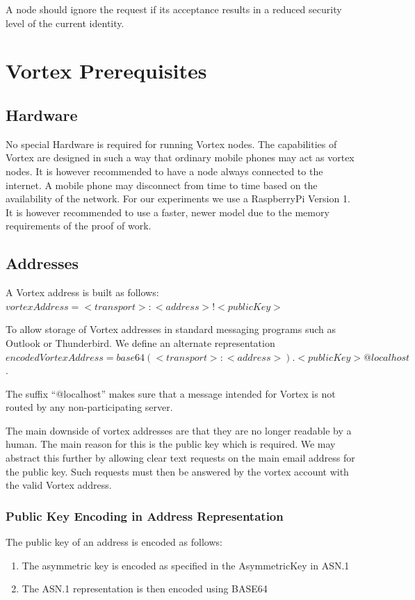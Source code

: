 A node should ignore the request if its acceptance results in a reduced security level of the current identity.

\chapter{Vortex Prerequisites}
\section{Hardware}
No special Hardware is required for running Vortex nodes. The capabilities of Vortex are designed in such a way that ordinary mobile phones may act as vortex nodes. It is however recommended to have a node always connected to the internet. A mobile phone may disconnect from time to time based on the availability of the network. For our experiments we use a RaspberryPi Version 1. It is however recommended to use a faster, newer model due to the memory requirements of the proof of work.

\section{Addresses}
A Vortex address is built as follows: $vortexAddress=<transport>:<address>!<publicKey>$

To allow storage of Vortex addresses in standard messaging programs such as Outlook or Thunderbird. We define an alternate representation $encodedVortexAddress=base64(<transport>:<address>).<publicKey>@localhost$. 

The suffix ``@localhost'' makes sure that a message intended for Vortex is not routed by any non-participating server.

The main downside of vortex addresses are that they are no longer readable by a human. The main reason for this is the public key which is required. We may abstract this further by allowing clear text requests on the main email address for the public key. Such requests must then be answered by the vortex account with the valid Vortex address.

\subsection{Public Key Encoding in Address Representation}
The public key of an address is encoded as follows:
\begin{enumerate}
	\item The asymmetric key is encoded as specified in the AsymmetricKey in ASN.1
	\item The ASN.1 representation is then encoded using BASE64
\end{enumerate}	

